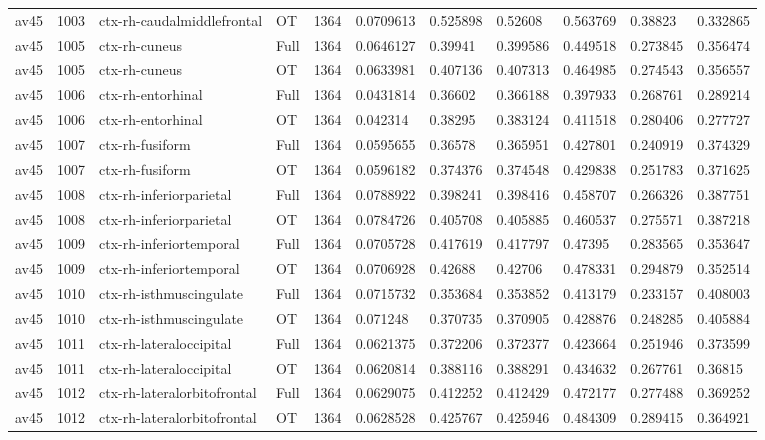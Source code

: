 \begin{landscape}
\begin{longtable}{lllllllllll}
av45 & 1003 & ctx-rh-caudalmiddlefrontal & OT & 1364 & 0.0709613 & 0.525898 & 0.52608 & 0.563769 & 0.38823 & 0.332865 \\
av45 & 1005 & ctx-rh-cuneus & Full & 1364 & 0.0646127 & 0.39941 & 0.399586 & 0.449518 & 0.273845 & 0.356474 \\
av45 & 1005 & ctx-rh-cuneus & OT & 1364 & 0.0633981 & 0.407136 & 0.407313 & 0.464985 & 0.274543 & 0.356557 \\
av45 & 1006 & ctx-rh-entorhinal & Full & 1364 & 0.0431814 & 0.36602 & 0.366188 & 0.397933 & 0.268761 & 0.289214 \\
av45 & 1006 & ctx-rh-entorhinal & OT & 1364 & 0.042314 & 0.38295 & 0.383124 & 0.411518 & 0.280406 & 0.277727 \\
av45 & 1007 & ctx-rh-fusiform & Full & 1364 & 0.0595655 & 0.36578 & 0.365951 & 0.427801 & 0.240919 & 0.374329 \\
av45 & 1007 & ctx-rh-fusiform & OT & 1364 & 0.0596182 & 0.374376 & 0.374548 & 0.429838 & 0.251783 & 0.371625 \\
av45 & 1008 & ctx-rh-inferiorparietal & Full & 1364 & 0.0788922 & 0.398241 & 0.398416 & 0.458707 & 0.266326 & 0.387751 \\
av45 & 1008 & ctx-rh-inferiorparietal & OT & 1364 & 0.0784726 & 0.405708 & 0.405885 & 0.460537 & 0.275571 & 0.387218 \\
av45 & 1009 & ctx-rh-inferiortemporal & Full & 1364 & 0.0705728 & 0.417619 & 0.417797 & 0.47395 & 0.283565 & 0.353647 \\
av45 & 1009 & ctx-rh-inferiortemporal & OT & 1364 & 0.0706928 & 0.42688 & 0.42706 & 0.478331 & 0.294879 & 0.352514 \\
av45 & 1010 & ctx-rh-isthmuscingulate & Full & 1364 & 0.0715732 & 0.353684 & 0.353852 & 0.413179 & 0.233157 & 0.408003 \\
av45 & 1010 & ctx-rh-isthmuscingulate & OT & 1364 & 0.071248 & 0.370735 & 0.370905 & 0.428876 & 0.248285 & 0.405884 \\
av45 & 1011 & ctx-rh-lateraloccipital & Full & 1364 & 0.0621375 & 0.372206 & 0.372377 & 0.423664 & 0.251946 & 0.373599 \\
av45 & 1011 & ctx-rh-lateraloccipital & OT & 1364 & 0.0620814 & 0.388116 & 0.388291 & 0.434632 & 0.267761 & 0.36815 \\
av45 & 1012 & ctx-rh-lateralorbitofrontal & Full & 1364 & 0.0629075 & 0.412252 & 0.412429 & 0.472177 & 0.277488 & 0.369252 \\
av45 & 1012 & ctx-rh-lateralorbitofrontal & OT & 1364 & 0.0628528 & 0.425767 & 0.425946 & 0.484309 & 0.289415 & 0.364921 \\

\end{longtable}
\end{landscape}
